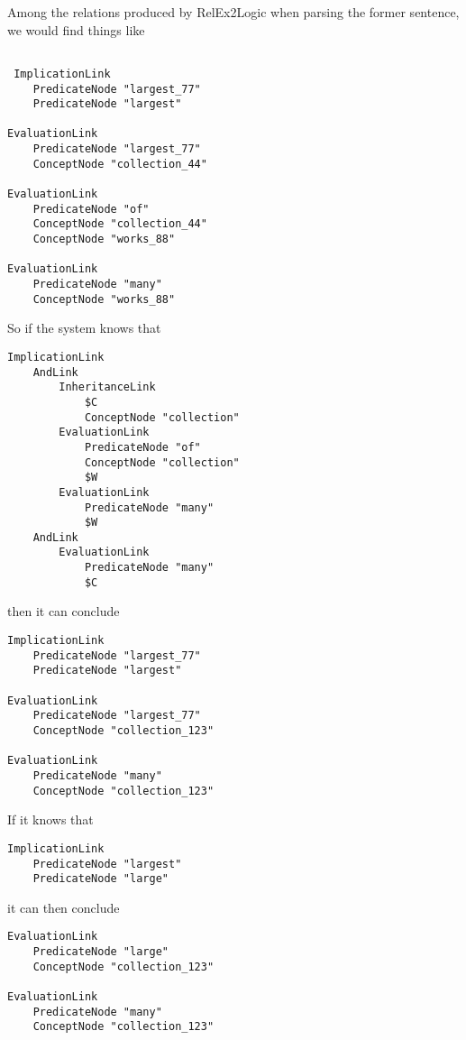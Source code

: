 Among the relations produced by RelEx2Logic when parsing the former sentence, we would find things like

 {\tt\begin{small}\begin{lstlisting}
 
 ImplicationLink
 	PredicateNode "largest_77"
	PredicateNode "largest"
 
EvaluationLink
	PredicateNode "largest_77"
	ConceptNode "collection_44"
	
EvaluationLink
	PredicateNode "of"
	ConceptNode "collection_44"
	ConceptNode "works_88"
	
EvaluationLink
	PredicateNode "many"
	ConceptNode "works_88"
\end{lstlisting}\end{small}}

\noindent So if the system knows that

{\tt\begin{small}\begin{lstlisting}
ImplicationLink
	AndLink
		InheritanceLink
			$C
			ConceptNode "collection"
		EvaluationLink
			PredicateNode "of"
			ConceptNode "collection"
			$W
		EvaluationLink
			PredicateNode "many"
			$W
	AndLink
		EvaluationLink
			PredicateNode "many"
			$C
 \end{lstlisting}\end{small}}

\noindent then it can conclude

 {\tt\begin{small}\begin{lstlisting}
ImplicationLink
 	PredicateNode "largest_77"
	PredicateNode "largest"
 
EvaluationLink
	PredicateNode "largest_77"
	ConceptNode "collection_123"
	
EvaluationLink
	PredicateNode "many"
	ConceptNode "collection_123"
\end{lstlisting}\end{small}}

\noindent If it knows that

 {\tt\begin{small}\begin{lstlisting}
ImplicationLink
	PredicateNode "largest"
	PredicateNode "large"
\end{lstlisting}\end{small}}

\noindent it can then conclude

 {\tt\begin{small}\begin{lstlisting}
EvaluationLink
	PredicateNode "large"
	ConceptNode "collection_123"
	
EvaluationLink
	PredicateNode "many"
	ConceptNode "collection_123"
\end{lstlisting}\end{small}}

